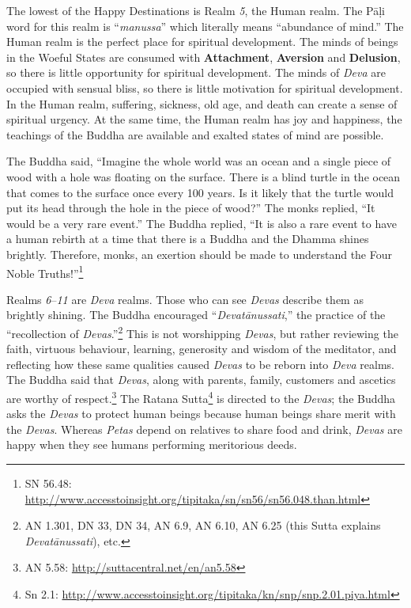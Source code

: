 The lowest of the Happy Destinations is Realm \textit{5}, the Human realm. The Pāḷi word for this realm is “\textit{manussa}” which literally means “abundance of mind.” The Human realm is the perfect place for spiritual development. The minds of beings in the Woeful States are consumed with \textbf{Attachment}, \textbf{Aversion} and \textbf{Delusion}, so there is little opportunity for spiritual development. The minds of \textit{Deva} are occupied with sensual bliss, so there is little motivation for spiritual development. In the Human realm, suffering, sickness, old age, and death can create a sense of spiritual urgency. At the same time, the Human realm has joy and happiness, the teachings of the Buddha are available and exalted states of mind are possible.

The Buddha said, “Imagine the whole world was an ocean and a single piece of wood with a hole was floating on the surface. There is a blind turtle in the ocean that comes to the surface once every 100 years. Is it likely that the turtle would put its head through the hole in the piece of wood?” The monks replied, “It would be a very rare event.” The Buddha replied, “It is also a rare event to have a human rebirth at a time that there is a Buddha and the Dhamma shines brightly. Therefore, monks, an exertion should be made to understand the Four Noble Truths!”\footnote{SN 56.48: \url{http://www.accesstoinsight.org/tipitaka/sn/sn56/sn56.048.than.html}}

Realms \textit{6}--\textit{11} are \textit{Deva} realms. Those who can see \textit{Devas} describe them as brightly shining. The Buddha encouraged “\textit{Devatānussati},” the practice of the “recollection of \textit{Devas}.”\footnote{AN 1.301, DN 33, DN 34, AN 6.9, AN 6.10, AN 6.25 (this Sutta explains \textit{Devatānussati}), etc.} This is not worshipping \textit{Devas}, but rather reviewing the faith, virtuous behaviour, learning, generosity and wisdom of the meditator, and reflecting how these same qualities caused \textit{Devas} to be reborn into \textit{Deva} realms. The Buddha said that \textit{Devas}, along with parents, family, customers and ascetics are worthy of respect.\footnote{AN 5.58: \url{http://suttacentral.net/en/an5.58}} The Ratana Sutta\footnote{Sn 2.1: \url{http://www.accesstoinsight.org/tipitaka/kn/snp/snp.2.01.piya.html}} is directed to the \textit{Devas}; the Buddha asks the \textit{Devas} to protect human beings because human beings share merit with the \textit{Devas}. Whereas \textit{Petas} depend on relatives to share food and drink, \textit{Devas} are happy when they see humans performing meritorious deeds.

